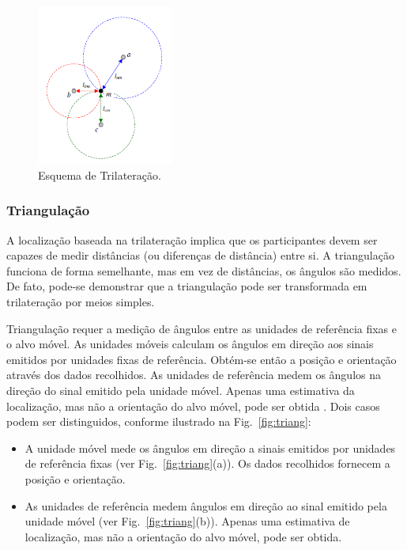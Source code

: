  \begin{figure}[ht]
\centering
    \includegraphics[resolution=300,width=0.4\textwidth,natwidth=610,natheight=642]{images/trilateracao.png}
    \caption{Esquema de Trilateração.}
    \label{fig:trilateracao}
\end{figure}

\subsubsection{Triangulação}\label{sec:triang}


A localização baseada na trilateração implica que os participantes devem ser capazes de medir distâncias (ou diferenças de distância) entre si. A triangulação funciona de forma semelhante, mas em vez de distâncias, os ângulos são medidos. De fato, pode-se demonstrar que a triangulação pode ser transformada em trilateração por meios simples\cite{linde2006aspects}. 

Triangulação requer a medição de ângulos entre as unidades de referência fixas e o alvo móvel. As unidades móveis calculam os ângulos em direção aos sinais emitidos por unidades fixas de referência. Obtém-se então a posição e orientação através dos dados recolhidos. As unidades de referência medem os ângulos na direção do sinal emitido pela unidade móvel. Apenas uma estimativa da localização, mas não a orientação do alvo móvel, pode ser obtida \cite{lutzke2013experimental}. Dois casos podem ser distinguidos, conforme ilustrado na Fig.~\ref{fig:triang}:


\begin{itemize}
  \item A unidade móvel mede os ângulos em direção a sinais emitidos por unidades de referência fixas (ver Fig.~\ref{fig:triang}(a)). Os dados recolhidos fornecem a posição e orientação.
  \item As unidades de referência medem ângulos em direção ao sinal emitido pela unidade móvel (ver Fig.~\ref{fig:triang}(b)). Apenas uma estimativa de localização, mas não a orientação do alvo móvel, pode ser obtida.
 \end{itemize}


